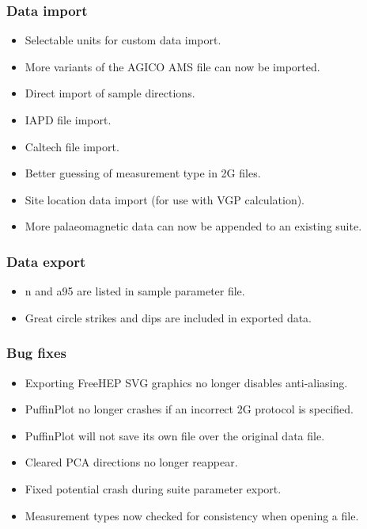 \documentclass[a4paper,british]{article}
\begin{document}
\subsubsection*{Data import}
\label{sec-1-3}
\begin{itemize}
\item Selectable units for custom data import.
\item More variants of the AGICO AMS file can now be imported.
\item Direct import of sample directions.
\item IAPD file import.
\item Caltech file import.
\item Better guessing of measurement type in 2G files.
\item Site location data import (for use with VGP calculation).
\item More palaeomagnetic data can now be appended to an existing suite.
\end{itemize}

\subsubsection*{Data export}
\label{sec-1-4}
\begin{itemize}
\item n and a95 are listed in sample parameter file.
\item Great circle strikes and dips are included in exported data.
\end{itemize}

\subsubsection*{Bug fixes}
\label{sec-1-5}
\begin{itemize}
\item Exporting FreeHEP SVG graphics no longer disables anti-aliasing.
\item PuffinPlot no longer crashes if an incorrect 2G protocol is
specified.
\item PuffinPlot will not save its own file over the original data file.
\item Cleared PCA directions no longer reappear.
\item Fixed potential crash during suite parameter export.
\item Measurement types now checked for consistency when opening a file.
\end{itemize}
\end{document}
